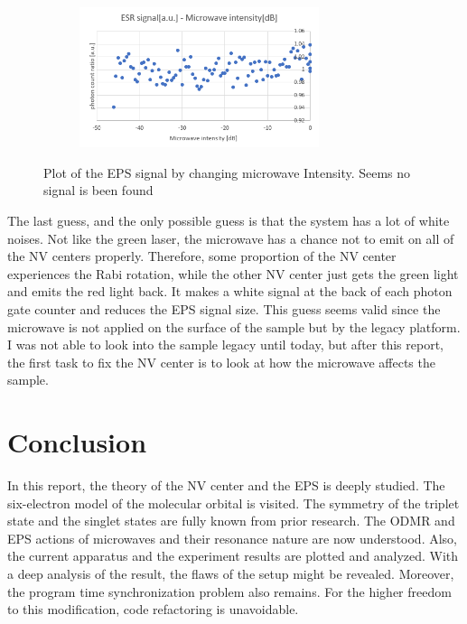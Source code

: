 \documentclass{article}
\begin{document}
\begin{figure}[ht]
    \centering
    \begin{subfigure}[b]{7cm}
        \centering
        \includegraphics[width=7cm]{./figs/result2.png}
    \end{subfigure}
    \hfill
    \caption{
        Plot of the EPS signal by changing microwave Intensity.
        Seems no signal is been found
    }
    \label{fig: result2}
\end{figure}
The last guess, and the only possible guess is that the system has a lot of white noises.
Not like the green laser, the microwave has a chance not to emit on all of the NV centers properly.
Therefore, some proportion of the NV center experiences the Rabi rotation, while the other NV center just gets the green light and emits the red light back.
It makes a white signal at the back of each photon gate counter and reduces the EPS signal size.
This guess seems valid since the microwave is not applied on the surface of the sample but by the legacy platform.
I was not able to look into the sample legacy until today, but after this report, the first task to fix the NV center is to look at how the microwave affects the sample.

\section{Conclusion}
In this report, the theory of the NV center and the EPS is deeply studied.
The six-electron model of the molecular orbital is visited.
The symmetry of the triplet state and the singlet states are fully known from prior research.
The ODMR and EPS actions of microwaves and their resonance nature are now understood.
Also, the current apparatus and the experiment results are plotted and analyzed.
With a deep analysis of the result, the flaws of the setup might be revealed.
Moreover, the program time synchronization problem also remains.
For the higher freedom to this modification, code refactoring is unavoidable.





\end{document}
